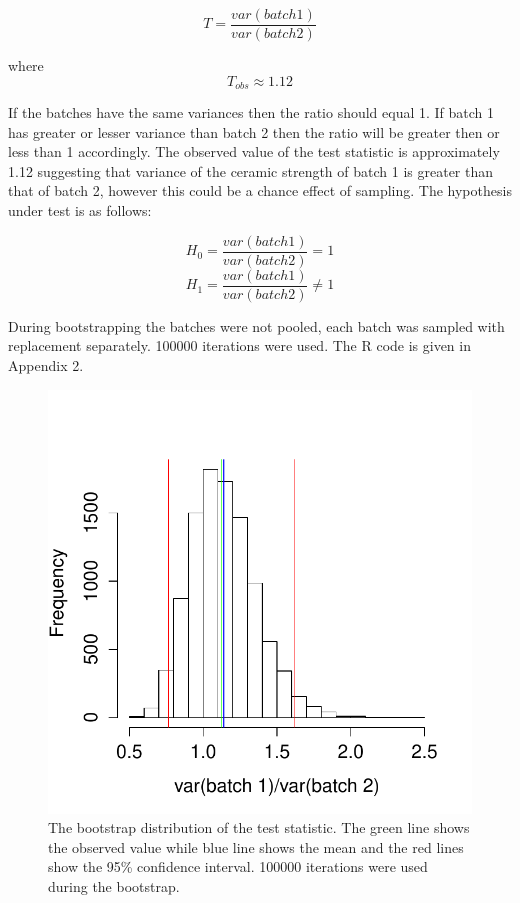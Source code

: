\documentclass[a4paper, 10pt]{article}
\begin{document}
\[
T =\frac{var(batch 1)}{var(batch 2)}
\]

where
\[
T_{obs} \approx 1.12
\]

If the batches have the same variances then the ratio should equal 1. If batch 1 has greater or lesser variance than batch 2 then the ratio will be greater then or less than 1 accordingly. The observed value of the test statistic is approximately 1.12 suggesting that variance of the ceramic strength of batch 1 is greater than that of batch 2, however this could be a chance effect of sampling. The hypothesis under test is as follows:

\[
H_0 =\frac{var(batch 1)}{var(batch 2)} = 1
\]
\[
H_1 =\frac{var(batch 1)}{var(batch 2)} \neq 1
\]

During bootstrapping the batches were not pooled, each batch was sampled with replacement separately. 100000 iterations were used. The R code is given in Appendix 2.

\begin{figure}[H]
\begin{center}
\includegraphics[scale=0.75]{cdf.pdf}
\caption{The bootstrap distribution of the test statistic. The green line shows the observed value while blue line shows the mean and the red lines show the 95\% confidence interval. 100000 iterations were used during the bootstrap.}
\label{F:Box}
\end{center}
\end{figure}
\end{document}
